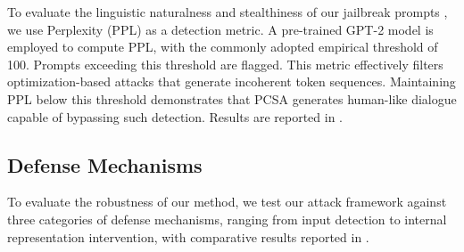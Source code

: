 \documentclass[11pt]{article}
\begin{document}
To evaluate the linguistic naturalness and stealthiness of our jailbreak prompts \cite{alon2023detecting}, we use Perplexity (PPL) as a detection metric. 
A pre-trained GPT-2 model is employed to compute PPL, with the commonly adopted empirical threshold of 100. 
Prompts exceeding this threshold are flagged. This metric effectively filters optimization-based attacks that generate incoherent token sequences. Maintaining PPL below this threshold demonstrates that PCSA generates human-like dialogue capable of bypassing such detection. Results are reported in .

\subsection{Defense Mechanisms}
To evaluate the robustness of our method, we test our attack framework against three categories of defense mechanisms, ranging from input detection to internal representation intervention, with comparative results reported in .
\end{document}
